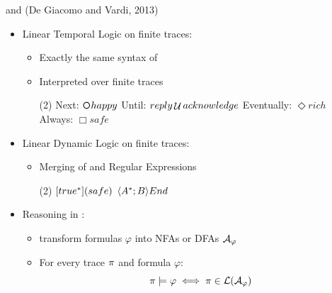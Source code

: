 \documentclass{beamer}
\begin{document}
\begin{frame}{\LTLf and \LDLf (De Giacomo and Vardi, 2013)}
	\begin{itemize}
		\item Linear Temporal Logic on finite traces: \LTLf
			\begin{itemize}
				\item Exactly the same syntax of \LTL
				\item Interpreted over finite traces
	
			\begin{tasks}[counter-format = -](2)
				\task Next: $\Next happy$
				\task Until: $reply \mathop{\mathcal{U}} acknowledge$
				\task Eventually: $\Diamond rich$
				\task Always: $\Box safe$
			\end{tasks}
			
			\end{itemize}

	
		\item Linear Dynamic Logic on finite traces: \LTLf
			\begin{itemize}
				\item Merging of \LTLf and Regular Expressions
	
				\begin{tasks}[counter-format = -](2)
					\task $[true^*](safe)$
					\task $\langle A^*;B \rangle End$
				\end{tasks}
			\end{itemize}
		
		\item Reasoning in \LLf:
			\begin{itemize}
				\item transform formulas $\varphi$ into NFAs or DFAs $\mathcal{A}_\varphi$
				\item For every trace $\pi$ and \LLf formula $\varphi$: \[\pi \models \varphi \iff \pi \in \mathcal{L}(\mathcal{A}_\varphi)\]
			\end{itemize}
	\end{itemize}
\end{frame}
\end{document}
